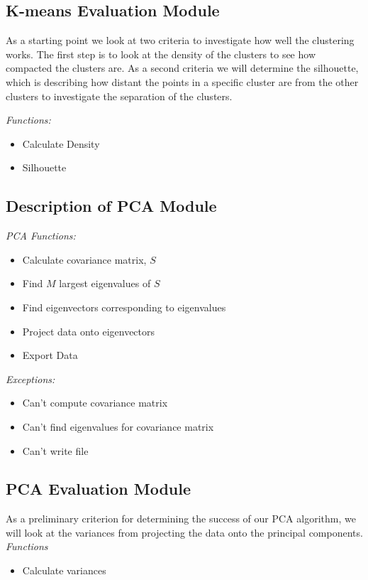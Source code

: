 \documentclass[12pt]{article} %
\begin{document}
\subsection{K-means Evaluation Module}
As a starting point we look at two criteria to investigate how well the clustering works. The first step is to look at the density of the clusters to see how compacted the clusters are. As a second criteria we will determine the silhouette, which is describing how distant the points in a specific cluster are from the other clusters to investigate the separation of the clusters.

\emph{Functions:}
	\begin{itemize}
		\item Calculate Density 
		\item Silhouette
	\end{itemize}


\subsection{Description of PCA Module}
\emph{PCA Functions:}
\begin{itemize}
	\item Calculate covariance matrix, $S$
	\item Find $M$ largest eigenvalues of $S$
	\item Find eigenvectors corresponding to eigenvalues 
	\item Project data onto eigenvectors
	\item Export Data 
\end{itemize}

\emph{Exceptions:}
\begin{itemize}
	\item Can't compute covariance matrix 
	\item Can't find eigenvalues for covariance matrix
	\item Can't write file 
\end{itemize}

\subsection{PCA Evaluation Module}
As a preliminary criterion for determining the success of our PCA algorithm, we will look at the variances from projecting the data onto the principal components.
\emph{Functions}
\begin{itemize}
	\item Calculate variances 
\end{itemize}
\end{document}
